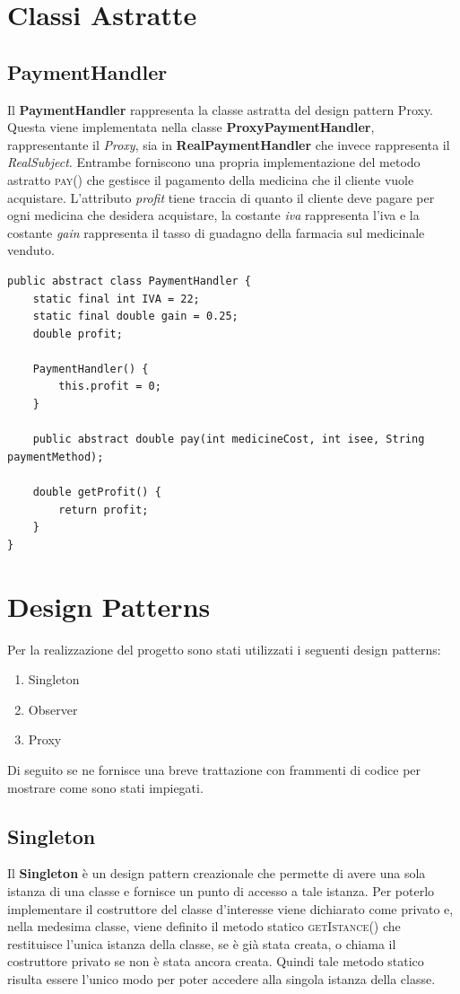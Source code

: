 \documentclass[a4paper, 10pt]{report}
\begin{document}
\section{Classi Astratte}
\subsection{PaymentHandler}
Il \textbf{PaymentHandler} rappresenta la classe astratta del design pattern Proxy. Questa viene implementata nella classe \textbf{ProxyPaymentHandler}, rappresentante il \textit{Proxy}, sia in \textbf{RealPaymentHandler} che invece rappresenta il \textit{RealSubject}. Entrambe forniscono una propria implementazione del metodo astratto \textsc{pay()} che gestisce il pagamento della medicina che il cliente vuole acquistare. L'attributo \textit{profit} tiene traccia di quanto il cliente deve pagare per ogni medicina che desidera acquistare, la costante \textit{iva} rappresenta l'iva e la costante \textit{gain} rappresenta il tasso di guadagno della farmacia sul medicinale venduto.\\
\begin{lstlisting}
public abstract class PaymentHandler {
    static final int IVA = 22;
    static final double gain = 0.25;
    double profit;

    PaymentHandler() {
        this.profit = 0;
    }

    public abstract double pay(int medicineCost, int isee, String paymentMethod);

    double getProfit() {
        return profit;
    }
}
\end{lstlisting}
\section{Design Patterns}
Per la realizzazione del progetto sono stati utilizzati i seguenti design patterns:
\begin{enumerate}
\item Singleton
\item Observer
\item Proxy
\end{enumerate}
Di seguito se ne fornisce una breve trattazione con frammenti di codice per mostrare come sono stati impiegati.
\subsection{Singleton}
Il \textbf{Singleton} è un design pattern creazionale che permette di avere una sola istanza di una classe e fornisce un punto di accesso a tale istanza. Per poterlo implementare il costruttore del classe d'interesse viene dichiarato come privato e, nella medesima classe, viene definito il metodo statico \textsc{getIstance()} che restituisce l'unica istanza della classe, se è già stata creata, o chiama il costruttore privato se non è stata ancora creata. Quindi tale metodo statico risulta essere l'unico modo per poter accedere alla singola istanza della classe.
\end{document}
